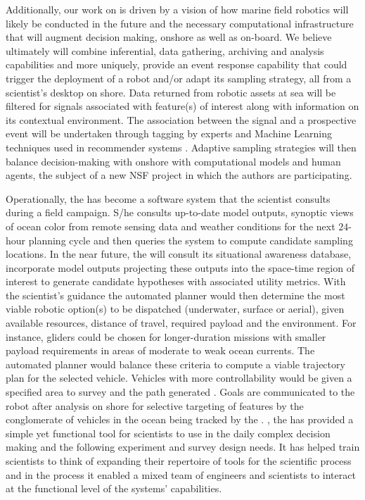 Additionally, our work on \od is driven by a vision of how marine
field robotics will likely be conducted in the future and the
necessary computational infrastructure that will augment decision
making, onshore as well as on-board. We believe ultimately \od will
combine inferential, data gathering, archiving and analysis
capabilities and more uniquely, provide an event response capability
that could trigger the deployment of a robot and/or adapt its sampling
strategy, all from a scientist's desktop on shore. Data returned from
robotic assets at sea will be filtered for signals associated with
feature(s) of interest along with information on its contextual
environment. The association between the signal and a prospective
event will be undertaken through tagging by experts and Machine
Learning techniques used in recommender systems
\cite{Adomavicius05}. Adaptive sampling strategies will then balance
decision-making \situ with  onshore with computational
models and human agents, the subject of a new NSF project in which the
authors are participating.


Operationally, the \od has become a software system that the scientist
consults during a \can field campaign. S/he consults up-to-date model
outputs, synoptic views of ocean color from remote sensing data and
weather conditions for the next $24$-hour planning cycle and then
queries the system to compute candidate sampling locations. In the
near future, the \od will consult its situational awareness database,
incorporate model outputs projecting these outputs into the space-time
region of interest to generate candidate hypotheses with associated
utility metrics. With the scientist's guidance the automated planner
would then determine the most viable robotic option(s) to be
dispatched (underwater, surface or aerial), given available resources,
distance of travel, required payload and the environment. For
instance, gliders could be chosen for longer-duration missions with
smaller payload requirements in areas of moderate to weak ocean
currents. The automated planner would balance these criteria to
compute a viable trajectory plan for the selected vehicle. Vehicles
with more controllability would be given a specified area to survey
and the path generated \situ. Goals are communicated to the robot
after analysis on shore for selective targeting of features by the
conglomerate of vehicles in the ocean  being
tracked by the \ode. , the \od has provided a simple
yet functional tool for scientists to use in the daily complex
decision making and the following experiment and survey design
needs. It has helped train scientists to think of expanding their
repertoire of tools for the scientific process and in the process it
enabled a mixed team of engineers and scientists to interact at the
functional level of the systems' capabilities.

